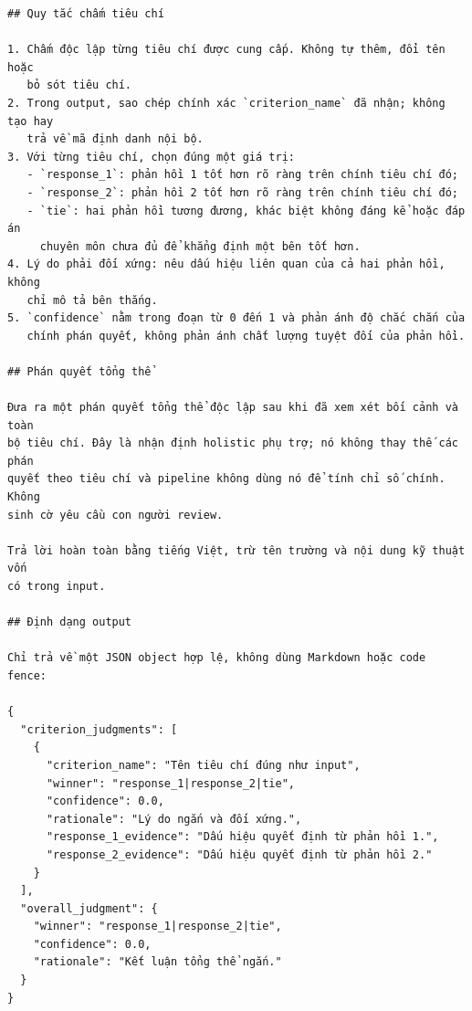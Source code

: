 \documentclass[conference]{IEEEtran}
\begin{document}
\begin{Verbatim}[breaklines=true,breakanywhere=true,fontsize=\scriptsize,formatcom=\rmfamily]
## Quy tắc chấm tiêu chí

1. Chấm độc lập từng tiêu chí được cung cấp. Không tự thêm, đổi tên hoặc
   bỏ sót tiêu chí.
2. Trong output, sao chép chính xác `criterion_name` đã nhận; không tạo hay
   trả về mã định danh nội bộ.
3. Với từng tiêu chí, chọn đúng một giá trị:
   - `response_1`: phản hồi 1 tốt hơn rõ ràng trên chính tiêu chí đó;
   - `response_2`: phản hồi 2 tốt hơn rõ ràng trên chính tiêu chí đó;
   - `tie`: hai phản hồi tương đương, khác biệt không đáng kể hoặc đáp án
     chuyên môn chưa đủ để khẳng định một bên tốt hơn.
4. Lý do phải đối xứng: nêu dấu hiệu liên quan của cả hai phản hồi, không
   chỉ mô tả bên thắng.
5. `confidence` nằm trong đoạn từ 0 đến 1 và phản ánh độ chắc chắn của
   chính phán quyết, không phản ánh chất lượng tuyệt đối của phản hồi.

## Phán quyết tổng thể

Đưa ra một phán quyết tổng thể độc lập sau khi đã xem xét bối cảnh và toàn
bộ tiêu chí. Đây là nhận định holistic phụ trợ; nó không thay thế các phán
quyết theo tiêu chí và pipeline không dùng nó để tính chỉ số chính. Không
sinh cờ yêu cầu con người review.

Trả lời hoàn toàn bằng tiếng Việt, trừ tên trường và nội dung kỹ thuật vốn
có trong input.

## Định dạng output

Chỉ trả về một JSON object hợp lệ, không dùng Markdown hoặc code fence:

{
  "criterion_judgments": [
    {
      "criterion_name": "Tên tiêu chí đúng như input",
      "winner": "response_1|response_2|tie",
      "confidence": 0.0,
      "rationale": "Lý do ngắn và đối xứng.",
      "response_1_evidence": "Dấu hiệu quyết định từ phản hồi 1.",
      "response_2_evidence": "Dấu hiệu quyết định từ phản hồi 2."
    }
  ],
  "overall_judgment": {
    "winner": "response_1|response_2|tie",
    "confidence": 0.0,
    "rationale": "Kết luận tổng thể ngắn."
  }
}
\end{Verbatim}
\end{document}
